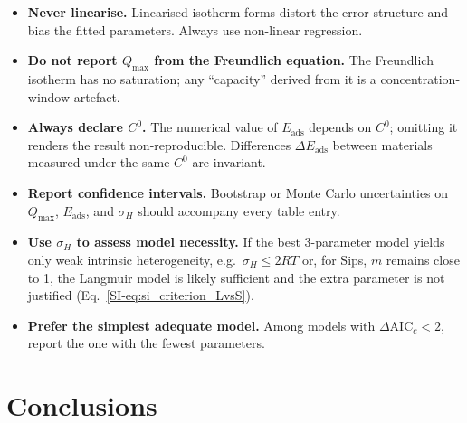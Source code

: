 \documentclass[journal=jacsat,manuscript=article]{achemso}
\begin{document}
	\begin{itemize}
		\item \textbf{Never linearise.} Linearised isotherm forms distort the error structure and bias the fitted parameters. Always use non-linear regression.
		\item \textbf{Do not report $Q_{\max}$ from the Freundlich equation.} The Freundlich isotherm has no saturation; any ``capacity'' derived from it is a concentration-window artefact.
		\item \textbf{Always declare $C^{0}$.} The numerical value of $E_{\mathrm{ads}}$ depends on $C^{0}$; omitting it renders the result non-reproducible. Differences $\Delta E_{\mathrm{ads}}$ between materials measured under the same $C^{0}$ are invariant.
		\item \textbf{Report confidence intervals.} Bootstrap or Monte Carlo uncertainties on $Q_{\max}$, $E_{\mathrm{ads}}$, and $\sigma_H$ should accompany every table entry.
		\item \textbf{Use $\sigma_H$ to assess model necessity.} If the best 3-parameter model yields only weak intrinsic heterogeneity, e.g.\ $\sigma_H \leq 2RT$ or, for Sips, $m$ remains close to 1, the Langmuir model is likely sufficient and the extra parameter is not justified (Eq.~\ref{SI-eq:si_criterion_LvsS}).
		\item \textbf{Prefer the simplest adequate model.} Among models with $\Delta\mathrm{AIC}_c < 2$, report the one with the fewest parameters.
	\end{itemize}

	\section{Conclusions}
	\label{sec:conclusions}


\end{document}
